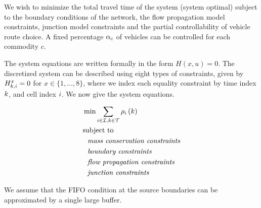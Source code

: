 
We wish to minimize the total travel time of the system (system optimal) subject to the boundary conditions of the network, the flow propagation model constraints, junction model constraints and the partial controllability of vehicle route choice. A fixed percentage $\alpha_c$ of vehicles can be controlled for each commodity $c$. 

The system equations are written formally in the form $H(x,u)=0$. The discretized system can be described using eight types of constraints, given by $H^{x}_{k, i} = 0$ for $x \in \{1, \dots, 8\}$, where we index each equality constraint by time index $k$, and cell index $i$. We now give the system equations.

\begin{align}
&\min \sum_{i\in{\cal I}, k\in{\cal T}} \rho_{i}\left(k\right) \nonumber \\
&\text{subject to} \nonumber \\
&\ \ \textit{mass conservation constraints} \nonumber \\
&\ \ \textit{boundary constraints} \nonumber \\
&\ \ \textit{flow propagation constraints} \nonumber \\
&\ \ \textit{junction constraints}  \nonumber 
\end{align}

We assume that the FIFO condition at the source boundaries can be approximated by a single large buffer.\\


\setcounter{oldequation}{\theequation}
\setcounter{equation}{0}
\renewcommand{\theequation}{H\arabic{equation}}


